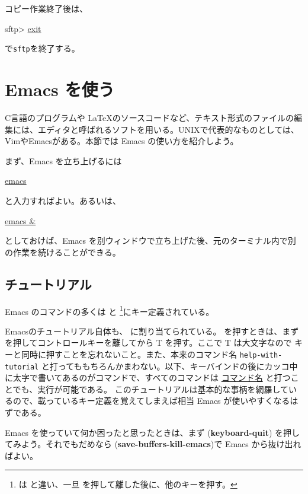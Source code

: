 コピー作業終了後は、
\begin{commandline2}
    sftp> \underline{exit}
\end{commandline2} \noindent
で\texttt{sftp}を終了する。

\section{Emacs を使う}

C言語のプログラムや \LaTeX のソースコードなど、テキスト形式のファイルの編集には、エディタと呼ばれるソフトを用いる。UNIXで代表的なものとしては、VimやEmacsがある。本節では Emacs の使い方を紹介しよう。

まず、Emacs を立ち上げるには
\begin{commandline2}
    \prompt \underline{emacs}
\end{commandline2} \noindent
と入力すればよい。あるいは、
\begin{commandline2}
    \prompt \underline{emacs \&}
\end{commandline2} \noindent
としておけば、Emacs を別ウィンドウで立ち上げた後、元のターミナル内で別の作業を続けることができる。
\subsection{チュートリアル}
Emacs のコマンドの多くは
 と \footnote{ は  と違い、一旦  を押して離した後に、他のキーを押す。}にキー定義されている。

Emacsのチュートリアル自体も、
  に割り当てられている。  を押すときは、まずを押してコントロールキーを離してから T を押す。ここで T は大文字なので  キーと同時に押すことを忘れないこと。また、本来のコマンド名  \texttt{help-with-tutorial} と打ってももちろんかまわない。以下、キーバインドの後にカッコ中に太字で書いてあるのがコマンドで、すべてのコマンドは  \underline{コマンド名} と打つことでも、実行が可能である。
このチュートリアルは基本的な事柄を網羅しているので、載っているキー定義を覚えてしまえば相当 Emacs が使いやすくなるはずである。

Emacs を使っていて何か困ったと思ったときは、まず  (\textbf{keyboard-quit})
を押してみよう。それでもだめなら   (\textbf{save-buffers-kill-emacs})で Emacs から抜け出ればよい。

